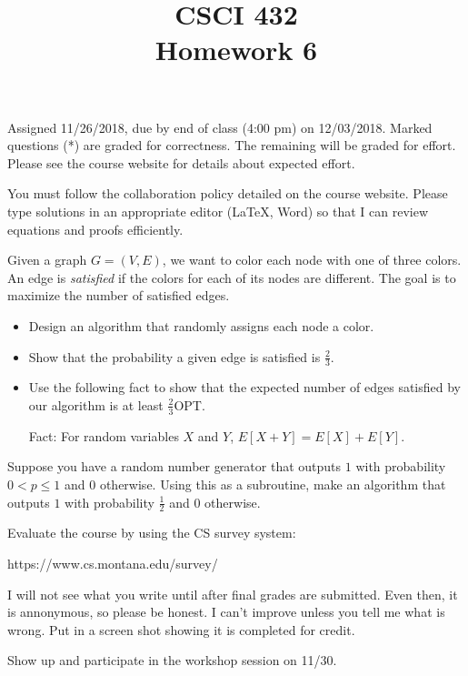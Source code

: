 \documentclass[12pt]{article}
\newenvironment{problem}[2][Problem]
{\begin{trivlist}
\item[\hskip \labelsep {\bfseries #1}\hskip \labelsep {\bfseries #2.}]}{\end{trivlist}}
\begin{document}
 
\title{CSCI 432\\Homework 6}
\date{}
\maketitle

Assigned 11/26/2018, due by end of class (4:00 pm) on 12/03/2018. Marked questions (*) are graded for correctness. The remaining will be graded for effort. Please see the course website for details about expected effort.

You must follow the collaboration policy detailed on the course website. Please type solutions in an appropriate editor (\LaTeX, Word) so that I can review equations and proofs efficiently. 

\begin{problem}{1*}
Given a graph $G=(V,E)$, we want to color each node with one of three colors. An edge is \textit{satisfied} if the colors for each of its nodes are different. The goal is to maximize the number of satisfied edges.

\begin{itemize}
\item Design an algorithm that randomly assigns each node a color.

\item Show that the probability a given edge is satisfied is $\frac{2}{3}$.

\item Use the following fact to show that the expected number of edges satisfied by our algorithm is at least $\frac{2}{3}$OPT. 

Fact: For random variables $X$ and $Y$, $E[X+Y] = E[X]+E[Y]$.
\end{itemize}
\end{problem}

\begin{problem}{2}
Suppose you have a random number generator that outputs $1$ with probability $0 < p \le 1$ and $0$ otherwise. Using this as a subroutine, make an algorithm that outputs $1$ with probability $\frac{1}{2}$ and $0$ otherwise.
\end{problem}

\begin{problem}{3*}
Evaluate the course by using the CS survey system: 

https://www.cs.montana.edu/survey/

I will not see what you write until after final grades are submitted. Even then, it is annonymous, so please be honest. I can't improve unless you tell me what is wrong. Put in a screen shot showing it is completed for credit.
\end{problem}

\begin{problem}{4}
Show up and participate in the workshop session on 11/30.
\end{problem}
 
\end{document}
